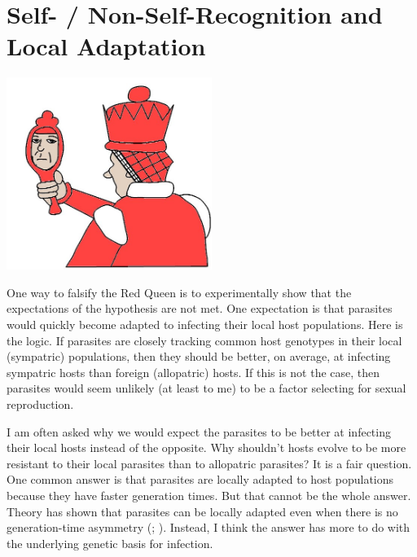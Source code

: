 \documentclass[
  letterpaper,
]{book}
\begin{document}

\chapter{Self- / Non-Self-Recognition and Local
Adaptation}\label{sec-self-non}

\begin{center}
\includegraphics[width=0.5\textwidth,height=\textheight]{images/fig4-1.jpeg}
\end{center}

One way to falsify the Red Queen is to experimentally show that the
expectations of the hypothesis are not met. One expectation is that
parasites would quickly become adapted to infecting their local host
populations. Here is the logic. If parasites are closely tracking common
host genotypes in their local (sympatric) populations, then they should
be better, on average, at infecting sympatric hosts than foreign
(allopatric) hosts. If this is not the case, then parasites would seem
unlikely (at least to me) to be a factor selecting for sexual
reproduction.

I am often asked why we would expect the parasites to be better at
infecting their local hosts instead of the opposite. Why shouldn't hosts
evolve to be more resistant to their local parasites than to allopatric
parasites? It is a fair question. One common answer is that parasites
are locally adapted to host populations because they have faster
generation times. But that cannot be the whole answer. Theory has shown
that parasites can be locally adapted even when there is no
generation-time asymmetry (; ). Instead, I
think the answer has more to do with the underlying genetic basis for
infection.
\end{document}
